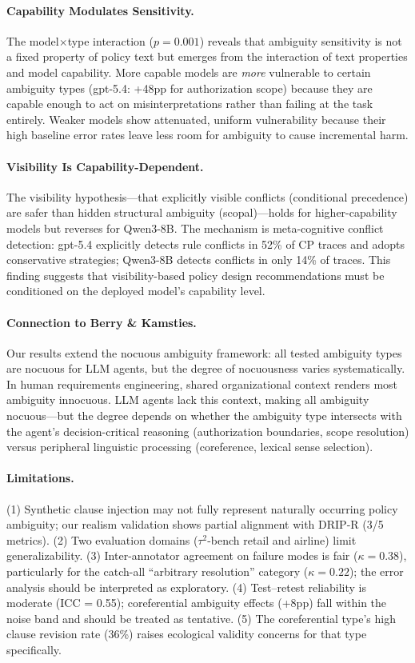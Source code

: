 \documentclass[11pt,a4paper]{article}
\begin{document}
\paragraph{Capability Modulates Sensitivity.}
The model$\times$type interaction ($p = 0.001$) reveals that ambiguity sensitivity is not a fixed property of policy text but emerges from the interaction of text properties and model capability. More capable models are \emph{more} vulnerable to certain ambiguity types (gpt-5.4: +48pp for authorization scope) because they are capable enough to act on misinterpretations rather than failing at the task entirely. Weaker models show attenuated, uniform vulnerability because their high baseline error rates leave less room for ambiguity to cause incremental harm.

\paragraph{Visibility Is Capability-Dependent.}
The visibility hypothesis---that explicitly visible conflicts (conditional precedence) are safer than hidden structural ambiguity (scopal)---holds for higher-capability models but reverses for Qwen3-8B. The mechanism is meta-cognitive conflict detection: gpt-5.4 explicitly detects rule conflicts in 52\% of CP traces and adopts conservative strategies; Qwen3-8B detects conflicts in only 14\% of traces. This finding suggests that visibility-based policy design recommendations must be conditioned on the deployed model's capability level.

\paragraph{Connection to Berry \& Kamsties.}
Our results extend the nocuous ambiguity framework: all tested ambiguity types are nocuous for LLM agents, but the degree of nocuousness varies systematically. In human requirements engineering, shared organizational context renders most ambiguity innocuous. LLM agents lack this context, making all ambiguity nocuous---but the degree depends on whether the ambiguity type intersects with the agent's decision-critical reasoning (authorization boundaries, scope resolution) versus peripheral linguistic processing (coreference, lexical sense selection).

\paragraph{Limitations.}
(1) Synthetic clause injection may not fully represent naturally occurring policy ambiguity; our realism validation shows partial alignment with DRIP-R (3/5 metrics). (2) Two evaluation domains ($\tau^2$-bench retail and airline) limit generalizability. (3) Inter-annotator agreement on failure modes is fair ($\kappa = 0.38$), particularly for the catch-all ``arbitrary resolution'' category ($\kappa = 0.22$); the error analysis should be interpreted as exploratory. (4) Test--retest reliability is moderate (ICC = 0.55); coreferential ambiguity effects (+8pp) fall within the noise band and should be treated as tentative. (5) The coreferential type's high clause revision rate (36\%) raises ecological validity concerns for that type specifically.
\end{document}
